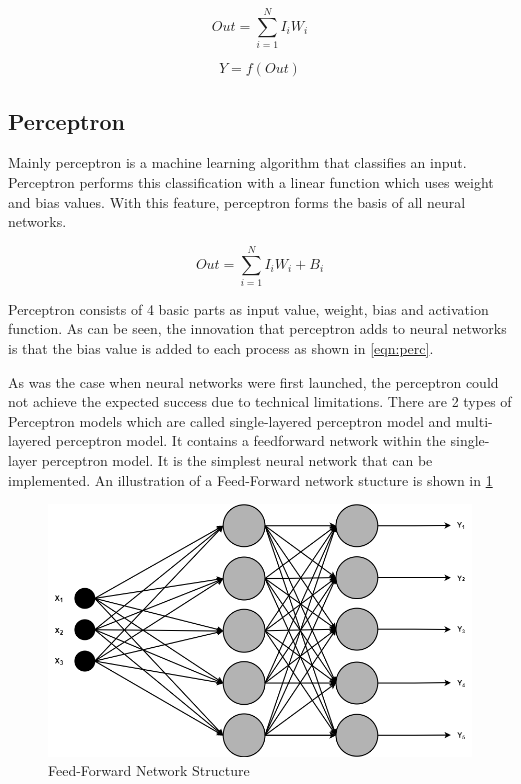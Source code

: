 \begin{equation}
\label{eqn:nn1}
    Out = \sum\limits_{i=1}^{N}{I_i W_i}
\end{equation}

\begin{equation}
\label{eqn:nn2}
    Y = f(Out)
\end{equation}

\subsection{Perceptron}

Mainly perceptron is a machine learning algorithm that classifies an input. Perceptron performs this classification with a linear function which uses weight and bias values. With this feature, perceptron forms the basis of all neural networks.

\begin{equation}
\label{eqn:perc}
    Out = \sum\limits_{i=1}^{N}{I_i W_i+B_i}
\end{equation}

Perceptron consists of 4 basic parts as input value, weight, bias and activation function. As can be seen, the innovation that perceptron adds to neural networks is that the bias value is added to each process as shown in \ref{eqn:perc}.

As was the case when neural networks were first launched, the perceptron could not achieve the expected success due to technical limitations. There are 2 types of Perceptron models which are called single-layered perceptron model and multi-layered perceptron model. It contains a feedforward network within the single-layer perceptron model. It is the simplest neural network that can be implemented. An illustration of a Feed-Forward network stucture is shown in \ref{fig:feed-forwardl}

\begin{figure}[h]
    \centering
    \includegraphics[scale=0.45]{figures/chapter3/FeedForward.png}
    \caption{Feed-Forward Network Structure}
    \label{fig:feed-forwardl}
\end{figure}

